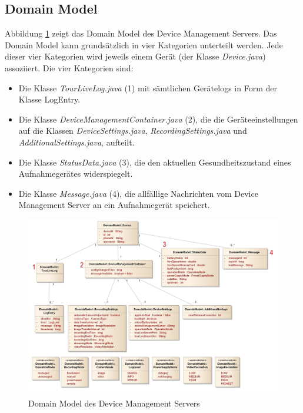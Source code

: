 \subsection{Domain Model}
Abbildung \ref{fig:domainmodeldevmgmtsrv} zeigt das Domain Model des Device Management Servers. Das Domain Model kann grundsätzlich in vier Kategorien unterteilt werden. Jede dieser vier Kategorien wird jeweils einem Gerät (der Klasse \textit{Device.java}) assoziiert. Die vier Kategorien sind: 


\begin{itemize}
\item Die Klasse \textit{TourLiveLog.java} (1) mit sämtlichen Gerätelogs in Form der Klasse LogEntry. 
\item Die Klasse \textit{DeviceManagementContainer.java} (2), die die Geräteeinstellungen auf die Klassen \textit{DeviceSettings.java}, \textit{RecordingSettings.java} und \textit{AdditionalSettings.java}, aufteilt.
\item Die Klasse \textit{StatusData.java} (3), die den aktuellen Gesundheitszustand eines Aufnahmegerätes widerspiegelt.
\item Die Klasse \textit{Message.java} (4), die allfällige Nachrichten vom Device Management Server an ein Aufnahmegerät speichert.
\end{itemize}

\begin{figure}[H]
	\centering
	\includegraphics[width=140mm]{images/devmgmtsrv/domainmodel.jpg}
	\caption{Domain Model des Device Management Servers}
	\label{fig:domainmodeldevmgmtsrv}
\end{figure}


